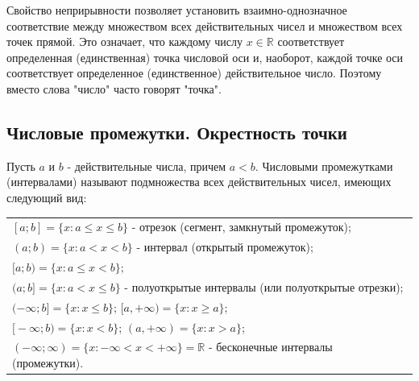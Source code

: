 Свойство неприрывности позволяет установить взаимно-однозначное соответствие между множеством всех действительных чисел и множеством всех точек прямой. Это означает, что каждому числу $x \in \mathbb{R}$ соответствует определенная (единственная) точка числовой оси и, наоборот, каждой точке оси соответствует определенное (единственное) действительное число. Поэтому вместо слова "число" часто говорят "точка".

\subsection{Числовые промежутки. Окрестность точки}

Пусть $a$ и $b$ - действительные числа, причем $a<b$.
Числовыми промежутками (интервалами) называют подмножества всех действительных чисел, имеющих следующий вид:

\begin{center}
\begin{tabular}{l}
 $[{a};{b}]=\{{x}:{a} \leqslant {x} \leqslant {b} \}$ - отрезок (сегмент, замкнутый промежуток); \\
 $({a};{b})=\{{x}:{a}<{x}<{b}\}$ - интервал (открытый промежуток); \\
 $\text{[}{a};{b})=\{{x}:{a} \leqslant {x}<{b}\}$; \\
 $({a};{b}\text{]}=\{{x}:{a}<{x} \leqslant {b}\}$ - полуоткрытые интервалы (или полуоткрытые отрезки); \\
 $(-\infty;{b}\text{]}=\{{x}:{x} \leqslant {b}\}$;  $\text{[}{a}, +\infty)=\{{x}:{x} \geqslant {a}\}$; \\
 $\text{[}-\infty;{b})=\{{x}:{x}<{b}\}$;  $({a},+\infty)=\{{x}:{x}>a\}$; \\
 $(-\infty;\infty)=\{{x}:-\infty<x<+\infty\}=\mathbb {R}$ - бесконечные интервалы (промежутки). \\
\end{tabular}
\end{center}

